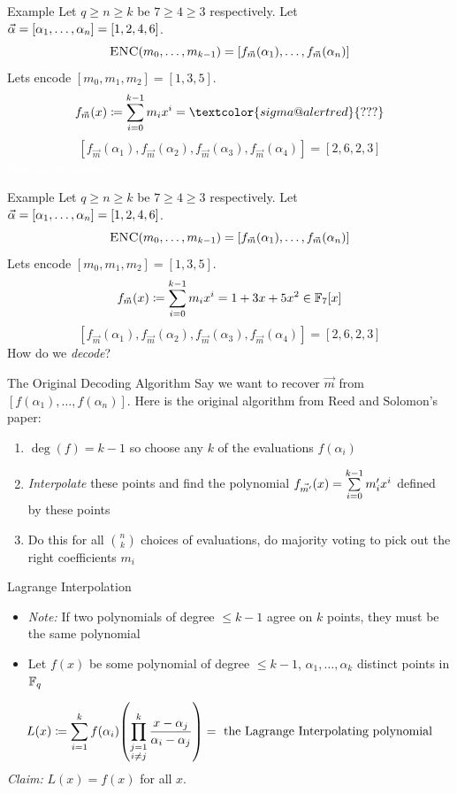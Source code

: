 \documentclass[aspectratio=169]{beamer}
\begin{document}
\begin{frame}{Example}
    Let $q \geq n \geq k$ be $7 \geq 4 \geq 3$ respectively.
    Let $\vec{\alpha} = \bqty{\alpha_1, \ldots, \alpha_n} = [1, 2, 4, 6]$. \pause
    \[
        \textsc{ENC}(m_0, \ldots, m_{k - 1}) = \bqty{f_{\vec{m}}(\alpha_1), \ldots, f_{\vec{m}}(\alpha_n)}
    \]
    Lets encode $[m_0, m_1, m_2] = [1, 3, 5]$.
    \[
        f_{\vec{m}}(x) \defeq  \Sum_{i = 0}^{k - 1} m_i x^i = \textcolor{sigma@alertred}{???}
    \] %
    {\color{white}\[
        [f_{\vec{m}}(\alpha_1), f_{\vec{m}}(\alpha_2), f_{\vec{m}}(\alpha_3), f_{\vec{m}}(\alpha_4)] = [2, 6, 2, 3]
    \]}
    \textcolor{white}{How do we decode?}
\end{frame}

\begin{frame}{Example}
    Let $q \geq n \geq k$ be $7 \geq 4 \geq 3$ respectively.
    Let $\vec{\alpha} = \bqty{\alpha_1, \ldots, \alpha_n} = [1, 2, 4, 6]$.
    \[
        \textsc{ENC}(m_0, \ldots, m_{k - 1}) = \bqty{f_{\vec{m}}(\alpha_1), \ldots, f_{\vec{m}}(\alpha_n)}
    \]
    Lets encode $[m_0, m_1, m_2] = [1, 3, 5]$.
    \[
        f_{\vec{m}}(x) \coloneqq  \sum\limits_{i = 0}^{k - 1} m_i x^i = 1 + 3x + 5x^2 \in \mathbb{F}_7[x]
    \] \pause
    \[
        [f_{\vec{m}}(\alpha_1), f_{\vec{m}}(\alpha_2), f_{\vec{m}}(\alpha_3), f_{\vec{m}}(\alpha_4)] = [2, 6, 2, 3]
    \]\pause
    How do we \emph{decode}?
\end{frame}

\begin{frame}{The Original Decoding Algorithm}
    Say we want to recover $\vec{m}$ from $[f(\alpha_1), \ldots, f(\alpha_n)]$.
    Here is the original algorithm from Reed and Solomon's paper: \pause
    \begin{enumerate}
        \item $\deg(f) = k - 1$ so choose any $k$ of the evaluations $f(\alpha_i)$ \pause
        \item \emph{Interpolate} these points and find the polynomial $f_{\vec{m'}}(x) = \sum\limits_{i = 0}^{k - 1} m_i' x^i$ defined by these points \pause
        \item Do this for all $\binom{n}{k}$ choices of evaluations, do majority voting to pick out the right coefficients $m_i$
    \end{enumerate}
\end{frame}

\begin{frame}{Lagrange Interpolation}
    \begin{itemize}
        \item \emph{Note:} If two polynomials of degree $\leq k - 1$ agree on $k$ points, they must be the same polynomial\pause
        \item Let $f(x)$ be some polynomial of degree $\leq k - 1$, $\alpha_1, \ldots, \alpha_{k}$ distinct points in $\mathbb{F}_q$ \pause
    \end{itemize}
    \[
        L(x) \defeq \sum_{i = 1}^{k} f(\alpha_i) \pqty{\prod_{\substack{j = 1 \\ i \neq j}}^{k} \frac{x - \alpha_j}{\alpha_i - \alpha_j}} = \text{ the \emph{Lagrange Interpolating polynomial}}
    \]\pause
    \emph{Claim:} $L(x) = f(x)$ for all $x$.
\end{frame}
\end{document}
